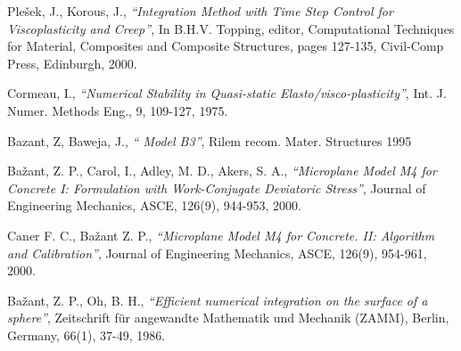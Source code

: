 \begin{thebibliography}{99}
 Ple\v{s}ek, J., Korous, J.,
{\em ``Integration Method with Time Step Control for Viscoplasticity and Creep''},
In B.H.V. Topping, editor, Computational Techniques for Material, Composites and Composite Structures,
pages 127-135, Civil-Comp Press, Edinburgh, 2000.


 Cormeau, I.,
{\em  ``Numerical Stability in Quasi-static Elasto/visco-plasticity''}, 
Int. J. Numer. Methods Eng., 9, 109-127, 1975.

 Bazant, Z, Baweja, J.,
{\em  `` Model B3''}, Rilem recom. Mater. Structures 1995


Ba\v{z}ant, Z. P., Carol, I., Adley, M. D., Akers, S. A., 
{\em ``Microplane Model M4 for Concrete I: Formulation with Work-Conjugate
Deviatoric Stress''},  Journal of Engineering Mechanics, ASCE, 126(9), 944-953, 2000.

 Caner F. C., Ba\v{z}ant Z. P.,
{\em ``Microplane Model M4 for Concrete. II: Algorithm and Calibration''},
Journal of Engineering Mechanics, ASCE, 126(9), 954-961, 2000.

 Ba\v{z}ant, Z. P., Oh, B. H., {\em ``Efficient numerical integration on the surface of a sphere''}, 
Zeitschrift f\"{u}r angewandte Mathematik und Mechanik (ZAMM), Berlin, Germany, 66(1), 37-49, 1986.

\end{thebibliography}


